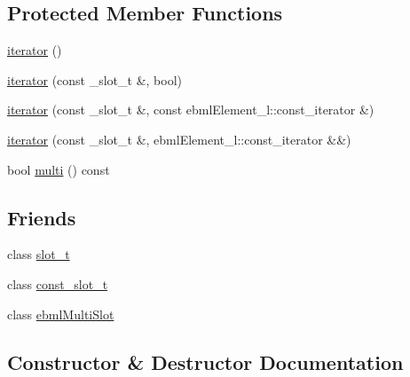 \subsection*{Protected Member Functions}
\begin{DoxyCompactItemize}
\item 
\mbox{\hyperlink{classebml_1_1const__slot__t_1_1iterator_a85c65d10e6caab4be5dd28ee989c8fd3}{iterator}} ()
\item 
\mbox{\hyperlink{classebml_1_1const__slot__t_1_1iterator_ab54d32b67b849a5c0acbf92585575a28}{iterator}} (const \+\_\+slot\+\_\+t \&, bool)
\item 
\mbox{\hyperlink{classebml_1_1const__slot__t_1_1iterator_af7917832d51214295c5410a97166f935}{iterator}} (const \+\_\+slot\+\_\+t \&, const ebml\+Element\+\_\+l\+::const\+\_\+iterator \&)
\item 
\mbox{\hyperlink{classebml_1_1const__slot__t_1_1iterator_a9e9d8197c02eff234b7f9506f35c14df}{iterator}} (const \+\_\+slot\+\_\+t \&, ebml\+Element\+\_\+l\+::const\+\_\+iterator \&\&)
\item 
bool \mbox{\hyperlink{classebml_1_1const__slot__t_1_1iterator_a5cca73207fa11af5d0f1b56f111942b0}{multi}} () const
\end{DoxyCompactItemize}
\subsection*{Friends}
\begin{DoxyCompactItemize}
\item 
class \mbox{\hyperlink{classebml_1_1const__slot__t_1_1iterator_a6546cbde3dc2846c329fd0ea73da851b}{slot\+\_\+t}}
\item 
class \mbox{\hyperlink{classebml_1_1const__slot__t_1_1iterator_a4df98a34a57f946e69b766054b391d08}{const\+\_\+slot\+\_\+t}}
\item 
class \mbox{\hyperlink{classebml_1_1const__slot__t_1_1iterator_ab14eb6c5a125d7276a7b4b5b6573428b}{ebml\+Multi\+Slot}}
\end{DoxyCompactItemize}


\subsection{Constructor \& Destructor Documentation}
\mbox{\label{classebml_1_1const__slot__t_1_1iterator_a85c65d10e6caab4be5dd28ee989c8fd3}} 
